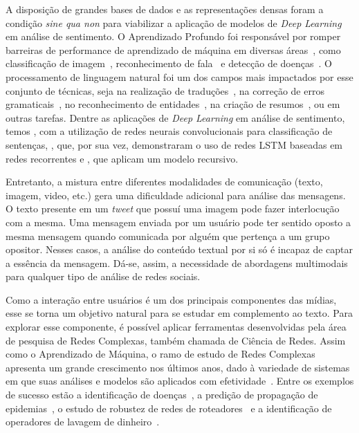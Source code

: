 A disposição de grandes bases de dados e as representações densas foram a
condição \textit{sine qua non} para viabilizar a aplicação de modelos de
\textit{Deep Learning} em análise de sentimento.
O Aprendizado Profundo foi responsável por romper barreiras de performance
de aprendizado de máquina em diversas áreas~\cite{lecun15}, como classificação
de imagem~\cite{krizhevsky12}, reconhecimento de fala~\cite{hinton12a} e detecção
de doenças~\cite{esteva17}.
O processamento de linguagem natural foi um dos campos mais impactados por esse
conjunto de técnicas, seja na realização de traduções~\cite{vaswani17},
na correção de erros gramaticais~\cite{ge18}, no reconhecimento de
entidades~\cite{akbik18}, na criação de resumos~\cite{wu18}, ou em outras
tarefas.
Dentre as aplicações de \textit{Deep Learning} em análise de sentimento,
temos \citet{kim14}, com a utilização de redes neurais convolucionais para
classificação de sentenças, \citet{zhou16}, que, por sua vez, demonstraram o
uso de redes LSTM baseadas em redes recorrentes e \citet{socher13}, que aplicam um
modelo recursivo.

Entretanto, a mistura entre diferentes modalidades de comunicação (texto, imagem,
video, etc.) gera uma dificuldade adicional para análise das mensagens.
O texto presente em um \textit{tweet} que possuí uma imagem pode fazer
interlocução com a mesma.
Uma mensagem enviada por um usuário pode ter sentido oposto a mesma mensagem
quando comunicada por alguém que pertença a um grupo opositor.
Nesses casos, a análise do conteúdo textual por si só é incapaz de captar a
essência da mensagem.
Dá-se, assim, a necessidade de abordagens multimodais para qualquer tipo de
análise de redes sociais.

Como a interação entre usuários é um dos principais componentes das mídias, esse
se torna um objetivo natural para se estudar em complemento ao texto.
Para explorar esse componente, é possível aplicar ferramentas desenvolvidas pela
área de pesquisa de Redes Complexas, também chamada de Ciência de Redes.
Assim como o Aprendizado de Máquina, o ramo de estudo de Redes Complexas
apresenta um grande crescimento nos últimos anos, dado à variedade de sistemas em
que suas análises e modelos são aplicados com efetividade~\cite{albert02}.
Entre os exemplos de sucesso estão a identificação de doenças~\cite{barabasi11},
a predição de propagação de epidemias~\cite{hufnagel04}, o estudo de robustez de
redes de roteadores~\cite{albert00} e a identificação de operadores de lavagem de
dinheiro~\cite{colladon17}.

